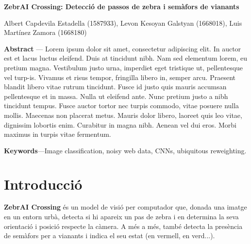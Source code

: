 \documentclass[10pt,a4paper,twocolumn,twoside]{article}
\begin{document}
{\sffamily
\noindent\textbf{\LARGE ZebrAI Crossing: Detecció de passos de zebra i semàfors de vianants}
\begin{center}
Albert Capdevila Estadella (1587933), Levon Kesoyan Galstyan (1668018), Luis Martínez Zamora (1668180)
\end{center}

\bigskip

\noindent 
\textbf{Abstract} --- Lorem ipsum dolor sit amet, consectetur adipiscing elit. In auctor est et lacus luctus eleifend. Duis at tincidunt nibh. Nam sed elementum lorem, eu pretium magna. Vestibulum justo urna, imperdiet eget tristique ut, pellentesque vel turp-is. Vivamus et risus tempor, fringilla libero in, semper arcu. Praesent blandit libero vitae rutrum tincidunt. Fusce id justo quis mauris accumsan pellentesque et in massa. Nulla ut eleifend ante. Nunc pretium justo a nibh tincidunt tempus. Fusce auctor tortor nec turpis commodo, vitae posuere nulla mollis. Maecenas non placerat metus. Mauris dolor libero, laoreet quis leo vitae, dignissim lobortis enim. Curabitur in magna nibh. Aenean vel dui eros. Morbi maximus in turpis vitae fermentum.

\bigskip

\noindent 
\textbf{Keywords}---Image classification, noisy web data, CNNs, ubiquitous reweighting.
}
\bigskip

{\vrule depth 0pt height 0.5pt width 3cm\hspace{7.5pt}%
%
\hspace{7.5pt}\vrule depth 0pt height 0.5pt width 3cm\relax}



\section{Introducció}

\textbf{ZebrAI Crossing} és un model de visió per computador que, donada una imatge en un entorn urbà, detecta si hi apareix un pas de zebra i en determina la seva orientació i posició respecte la càmera. A més a més, també detecta la presència de semàfors per a vianants i indica el seu estat (en vermell, en verd...).
\end{document}
